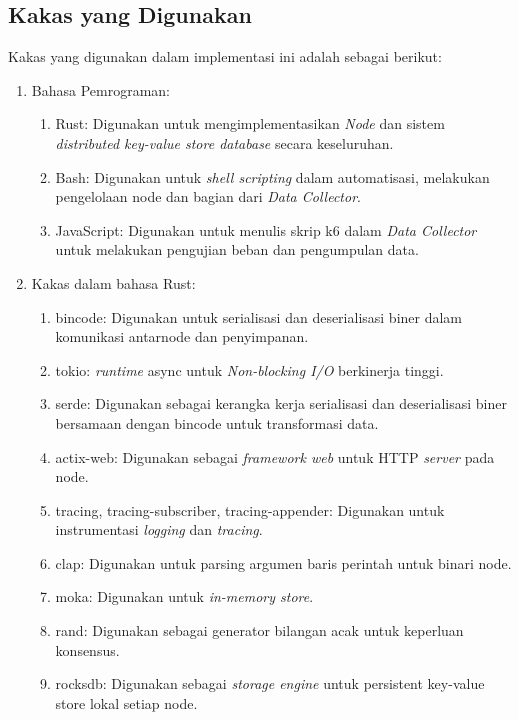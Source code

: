 \subsection{Kakas yang Digunakan}
\label{subsection:kakas-yang-digunakan}

Kakas yang digunakan dalam implementasi ini adalah sebagai berikut:
\begin{enumerate}
  \item Bahasa Pemrograman:
    \begin{enumerate}
      \item Rust: Digunakan untuk mengimplementasikan \textit{Node} dan sistem \textit{distributed key-value store database} secara keseluruhan.
      \item Bash: Digunakan untuk \textit{shell scripting} dalam automatisasi, melakukan pengelolaan node dan bagian dari \textit{Data Collector}.
      \item JavaScript: Digunakan untuk menulis skrip k6 dalam \textit{Data Collector} untuk melakukan pengujian beban dan pengumpulan data.
    \end{enumerate}
  \item Kakas dalam bahasa Rust:
    \begin{enumerate}
      \item bincode: Digunakan untuk serialisasi dan deserialisasi biner dalam komunikasi antarnode dan penyimpanan.
      \item tokio: \textit{runtime} async untuk \textit{Non-blocking I/O} berkinerja tinggi.
      \item serde: Digunakan sebagai kerangka kerja serialisasi dan deserialisasi biner bersamaan dengan bincode untuk transformasi data.
      \item actix-web: Digunakan sebagai \textit{framework web} untuk HTTP \textit{server} pada node.
      \item tracing, tracing-subscriber, tracing-appender: Digunakan untuk instrumentasi \textit{logging} dan \textit{tracing}.
      \item clap: Digunakan untuk parsing argumen baris perintah untuk binari node.
      \item moka: Digunakan untuk \textit{in-memory store}.
      \item rand: Digunakan sebagai generator bilangan acak untuk keperluan konsensus.
      \item rocksdb: Digunakan sebagai \textit{storage engine} untuk persistent key-value store lokal setiap node.
    \end{enumerate}

\end{enumerate}

